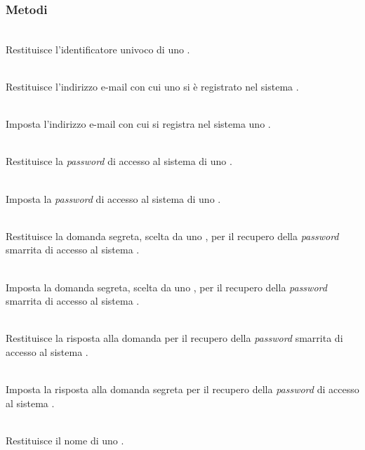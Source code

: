 \subsubsection*{Metodi}
\begin{description}
	\item{}\\
	Restituisce l'identificatore univoco di uno .
	\item{}\\
	Restituisce l'indirizzo e-mail con cui uno  si è registrato nel sistema \caName.
	\item{}\\ 
	Imposta l'indirizzo e-mail con cui si registra nel sistema \caName uno .
	\item{}\\
	Restituisce la \textit{password} di accesso al sistema \caName di uno .
	\item{}\\
	Imposta la \textit{password} di accesso al sistema di uno .
	\item{}\\
	Restituisce la domanda segreta, scelta da uno , per il recupero della \textit{password} smarrita di accesso al sistema \caName.
	\item{}\\
	Imposta la domanda segreta, scelta da uno , per il recupero della \textit{password} smarrita di accesso al sistema \caName.
	\item{}\\
	Restituisce la risposta alla domanda per il recupero della \textit{password} smarrita di accesso al sistema \caName.
	\item{}\\
	Imposta la risposta alla domanda segreta per il recupero della \textit{password} di accesso al sistema \caName.
	\item{}\\
	Restituisce il nome di uno .
	\item{}\\

\end{description}
